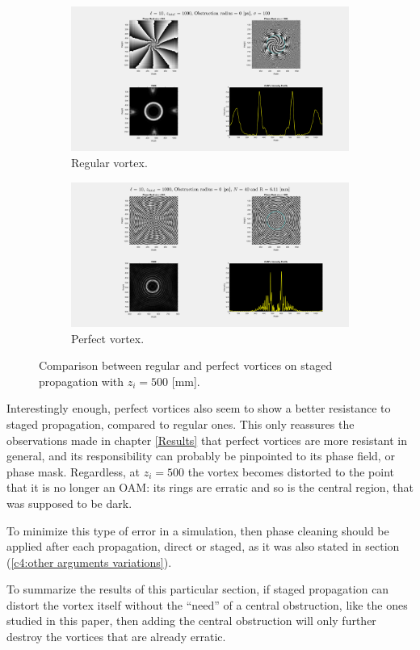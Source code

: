 \begin{figure}[htbp]
    \centering
    \begin{subfigure}[b]{0.45\textwidth}
        \centering
        \includegraphics[width=\textwidth]{images/Appendices/Additional_Results/Staged_Propagation/type=0_r=0_zi=500_zf=1000.png}
        \caption{Regular vortex.}
    \end{subfigure}
    \hfill
    \begin{subfigure}[b]{0.45\textwidth}
        \centering
        \includegraphics[width=\textwidth]{images/Appendices/Additional_Results/Staged_Propagation/type=1_r=0_zi=500_zf=1000.png}
        \caption{Perfect vortex.}
    \end{subfigure}
    \caption{Comparison between regular and perfect vortices on staged propagation with $z_i=500$ [mm].}
    \label{fig:staged_zi=500}
\end{figure}

Interestingly enough, perfect vortices also seem to show a better resistance to staged propagation, compared to regular ones. This only reassures the observations made in chapter \ref{Results} that perfect vortices are more resistant in general, and its responsibility can probably be pinpointed to its phase field, or phase mask. Regardless, at $z_i=500$ the vortex becomes distorted to the point that it is no longer an OAM: its rings are erratic and so is the central region, that was supposed to be dark.

To minimize this type of error in a simulation, then phase cleaning should be applied after each propagation, direct or staged, as it was also stated in section (\ref{c4:other arguments variations}).

To summarize the results of this particular section, if staged propagation can distort the vortex itself without the ``need'' of a central obstruction, like the ones studied in this paper, then adding the central obstruction will only further destroy the vortices that are already erratic.
